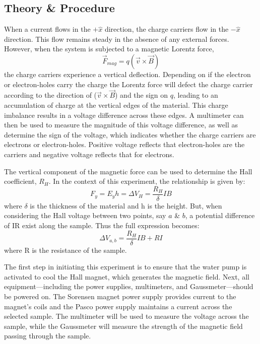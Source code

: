 \documentclass[a4paper,12pt,english]{all-in-one} %
\begin{document}
\begin{multicols}{2}

\section*{Theory \& Procedure}
{
When a current flows in the $+\hat{x}$  direction, the charge carriers flow in the $-\hat{x}$
direction. This flow remains steady in the absence of any external forces. However, when the system is subjected to a magnetic Lorentz force,
\begin{equation}
    \Vec{F}_{mag} = q(\Vec{v} \times \Vec{B})
\end{equation}
the charge carriers experience a vertical deflection. Depending on if the electron or electron-holes carry the charge the Lorentz force will defect the charge carrier according to the direction of ($\Vec{v} \times \Vec{B}$) and the sign on $q$, leading to an accumulation of charge at the vertical edges of the material. This charge imbalance results in a voltage difference across these edges. A multimeter can then be used to measure the magnitude of this voltage difference, as well as determine the sign of the voltage, which indicates whether the charge carriers are electrons or electron-holes. Positive voltage reflects that electron-holes are the carriers and negative voltage reflects that for electrons. 

The vertical component of the magnetic force can be used to determine the Hall coefficient, $R_H$. In the context of this experiment, the relationship is given by:
\begin{equation}
    F_y = E_yh = \Delta V_H = \frac{R_H}{\delta}IB
\end{equation}
where $\delta$ is the thickness of the material and h is the height. But, when considering the Hall voltage between two points, say $a$ \& $b$, a potential difference of IR exist along the sample. Thus the full expression becomes:
\begin{equation}\label{eq:linear_hall}
    \Delta V_{a,b} = \frac{R_H}{\delta}IB + RI
\end{equation}
where R is the resistance of the sample.
 
The first step in initiating this experiment is to ensure that the water pump is activated to cool the Hall magnet, which generates the magnetic field. Next, all equipment—including the power supplies, multimeters, and Gaussmeter—should be powered on. The Sorensen magnet power supply provides current to the magnet's coils and the Pasco power supply maintains a current across the selected sample. The multimeter will be used to measure the voltage across the sample, while the Gaussmeter will measure the strength of the magnetic field passing through the sample.

}
\end{multicols}
\end{document}

